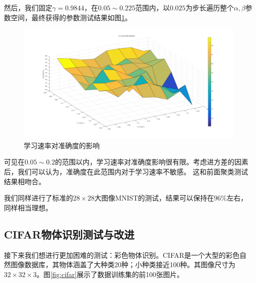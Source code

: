 然后，我们固定$\gamma=0.9844$，在$0.05\sim 0.225$范围内，以$0.025$为步长遍历整个$\alpha,\beta$参数空间，最终获得的参数测试结果如图\ref{fig:learningrate}。

\begin{figure}[htbp]
   \centering
   \includegraphics[width=\textwidth]{LearningRate.png} %
   \caption{学习速率对准确度的影响}
   \label{fig:learningrate}
\end{figure}

可见在$0.05\sim 0.2$的范围以内，学习速率对准确度影响很有限。考虑进方差的因素后，我们可以认为，准确度在此范围内对于学习速率不敏感。 这和前面聚类测试结果相吻合。


我们同样进行了标准的$28\times 28$大图像MNIST的测试，结果可以保持在$96\%$左右，同样相当理想。

\subsection{CIFAR物体识别测试与改进}
接下来我们想进行更加困难的测试：彩色物体识别。CIFAR是一个大型的彩色自然图像数据库\cite{CIFAR-10}，其物体涵盖了大种类20种；小种类接近100种。其图像尺寸为$32\times 32\times 3$。图\ref{fig:cifar}展示了数据训练集的前100张图片。

